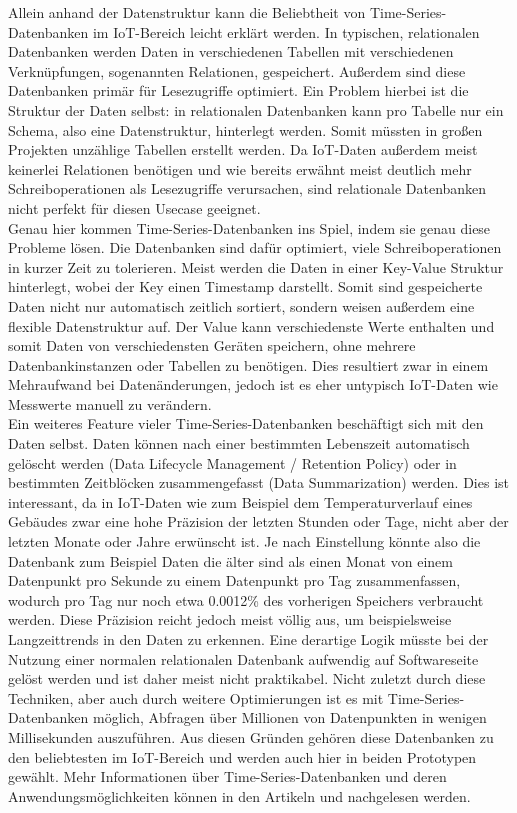 Allein anhand der Datenstruktur kann die Beliebtheit von Time-Series-Datenbanken im IoT-Bereich leicht erklärt werden. In typischen, relationalen Datenbanken werden Daten in verschiedenen Tabellen mit verschiedenen Verknüpfungen, sogenannten Relationen, gespeichert. Außerdem sind diese Datenbanken primär für Lesezugriffe optimiert. Ein Problem hierbei ist die Struktur der Daten selbst: in relationalen Datenbanken kann pro Tabelle nur ein Schema, also eine Datenstruktur, hinterlegt werden. Somit müssten in großen Projekten unzählige Tabellen erstellt werden.
Da IoT-Daten außerdem meist keinerlei Relationen benötigen und wie bereits erwähnt meist deutlich mehr Schreiboperationen als Lesezugriffe verursachen, sind rela\-tionale Datenbanken nicht perfekt für diesen Usecase geeignet.\\ Genau hier kommen Time-Series-Datenbanken ins Spiel, indem sie genau diese Probleme lösen. Die Datenbanken sind dafür optimiert, viele Schreiboperationen in kurzer Zeit zu tolerieren. Meist werden die Daten in einer Key-Value Struktur hinterlegt, wobei der Key einen Timestamp darstellt. Somit sind gespeicherte Daten nicht nur automatisch zeitlich sortiert, sondern weisen außerdem eine flexible Datenstruktur auf. Der Value kann verschiedenste Werte enthalten und somit Daten von verschiedensten Geräten speichern, ohne mehrere Datenbankinstanzen oder Tabellen zu benötigen. Dies resultiert zwar in einem Mehraufwand bei Datenänderungen, jedoch ist es eher untypisch IoT-Daten wie Messwerte manuell zu verändern.\\ 
Ein weiteres Feature vieler Time-Series-Datenbanken beschäftigt sich mit den Daten selbst. Daten können nach einer bestimmten Lebenszeit automatisch gelöscht werden (Data Lifecycle Management / Retention Policy) oder in bestimmten Zeitblöcken zusammengefasst (Data Summarization) werden. Dies ist interessant, da in IoT-Daten wie zum Beispiel dem Temperaturverlauf eines Gebäudes zwar eine hohe Präzision der letzten Stunden oder Tage, nicht aber der letzten Monate oder Jahre erwünscht ist. Je nach Einstellung könnte also die Datenbank zum Beispiel Daten die älter sind als einen Monat von einem Datenpunkt pro Sekunde zu einem Datenpunkt pro Tag zusammenfassen, wodurch pro Tag nur noch etwa 0.0012\% des vorherigen Speichers verbraucht werden. Diese Präzision reicht jedoch meist völlig aus, um beispielsweise Langzeittrends in den Daten zu erkennen. Eine derartige Logik müsste bei der Nutzung einer normalen relationalen Datenbank aufwendig auf Softwareseite gelöst werden und ist daher meist nicht praktikabel. Nicht zuletzt durch diese Techniken, aber auch durch weitere Optimierungen ist es mit Time-Series-Datenbanken möglich, Abfragen über Millionen von Datenpunkten in wenigen Millisekunden auszuführen. Aus diesen Gründen gehören diese Datenbanken zu den beliebtesten im IoT-Bereich und werden auch hier in beiden Prototypen gewählt. Mehr Informationen über Time-Series-Datenbanken und deren Anwendungsmöglichkeiten können in den Artikeln \cite{TimeSeriesWater.2019} und \cite{TimeSeriesInflux.2020} nachgelesen werden.

